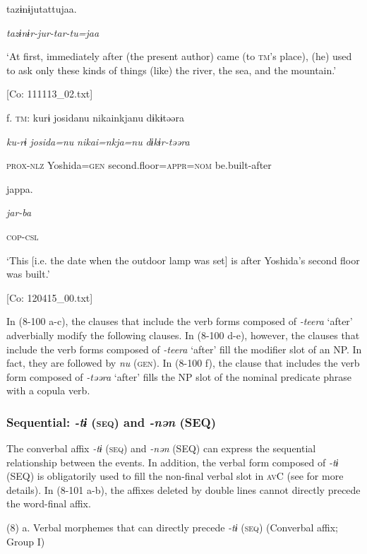       tazɨnɨjutattujaa.

      \textit{tazɨnɨr-jur-tar-tu=jaa}

      ‘At first, immediately after (the present author) came (to \textsc{tm}’s place), (he) used to ask only these kinds of things (like) the river, the sea, and the mountain.’

      [Co: 111113\_02.txt]

  f.  \textsc{tm}:  kurɨ  josidanu  {\textbar}nikai{\textbar}nkjanu  dɨkɨtəəra

      \textit{ku-rɨ}  \textit{josida=nu}  \textit{nikai=nkja=nu}  \textit{dɨkɨr-təəra}

      \textsc{prox}-\textsc{nlz}  Yoshida=\textsc{gen}  second.floor=\textsc{appr}=\textsc{nom}  be.built-after

      jappa.

      \textit{jar-ba}

      \textsc{cop}-\textsc{csl}

      ‘This [i.e. the date when the outdoor lamp was set] is after Yoshida’s second floor was built.’

      [Co: 120415\_00.txt]

In (8-100 a-c), the clauses that include the verb forms composed of \textit{{}-teera} ‘after’ adverbially modify the following clauses. In (8-100 d-e), however, the clauses that include the verb forms composed of \textit{{}-teera} ‘after’ fill the modifier slot of an NP. In fact, they are followed by \textit{nu} (\textsc{gen}). In (8-100 f), the clause that includes the verb form composed of \textit{{}-təəra} ‘after’ fills the NP slot of the nominal predicate phrase with a copula verb.

\subsubsection{Sequential: \textit{{}-tɨ} (\textsc{seq}) and \textit{{}-nən} (SEQ)}

The converbal affix \textit{{}-tɨ} (\textsc{seq}) and \textit{{}-nən} (SEQ) can express the sequential relationship between the events. In addition, the verbal form composed of \textit{{}-tɨ} (SEQ) is obligatorily used to fill the non-final verbal slot in \textsc{av}C (see  for more details). In (8-101 a-b), the affixes deleted by double lines cannot directly precede the word-final affix.

(8)  a. Verbal morphemes that can directly precede \textit{{}-tɨ} (\textsc{seq}) (Converbal affix; Group I)

